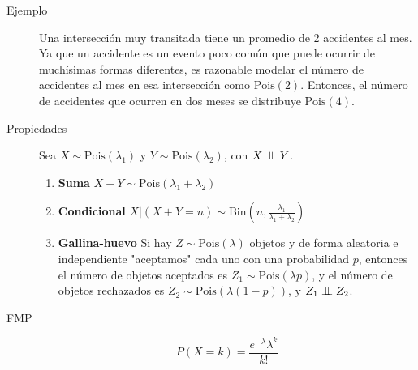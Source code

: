 \documentclass[12,landscape]{article}
\newcommand\independent{\protect\mathpalette{\protect\independenT}{\perp}}
\def\independenT#1#2{\mathrel{\setbox0\hbox{$#1#2$}%
    \copy0\kern-\wd0\mkern4mu\box0}}
\newcommand{\Bin}{\textrm{Bin}}
\newcommand{\Pois}{\textrm{Pois}}
\begin{document}
\begin{multicols*}{3}
\begin{description}
    \item[Ejemplo] Una intersección muy transitada tiene un promedio de 2 accidentes al mes. Ya que un accidente es un evento poco común que puede ocurrir de muchísimas formas diferentes, es razonable modelar el número de accidentes al mes en esa intersección como $\Pois(2)$. Entonces, el número de accidentes que ocurren en dos meses se distribuye $\Pois(4)$.
    
    \item[Propiedades]
Sea $X \sim \Pois(\lambda_1)$ y $Y \sim \Pois(\lambda_2)$, con $X \independent Y$.

\begin{enumerate}
    \item \textbf{Suma} $X + Y \sim \Pois(\lambda_1 + \lambda_2)$
    \item \textbf{Condicional} $X | (X + Y = n) \sim \Bin\left(n, \frac{\lambda_1}{\lambda_1 + \lambda_2}\right)$
    \item \textbf{Gallina-huevo} Si hay $Z \sim \Pois(\lambda)$ objetos y de forma aleatoria e independiente "aceptamos" cada uno con una probabilidad $p$, entonces el número de objetos aceptados es $Z_1 \sim \Pois(\lambda p)$, y el número de objetos rechazados es $Z_2 \sim \Pois(\lambda (1-p))$, y $Z_1 \independent Z_2$.
    
\end{enumerate}
    
     \item[FMP] 
        \[P(X = k) = \frac{e^{-\lambda}\lambda^k}{k!}\]
\end{description}



\end{multicols*}
\end{document}
